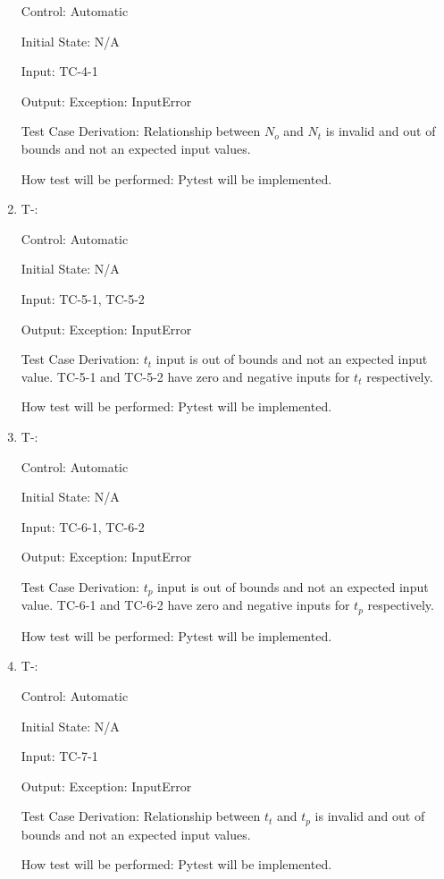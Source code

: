 \documentclass[12pt, titlepage]{article}
\newcounter{tinnum} %
\begin{document}
\begin{enumerate}
Control: Automatic
					
Initial State: N/A
					
Input: TC-4-1
					
Output: Exception: InputError

Test Case Derivation: Relationship between $N_o$ and $N_{t}$ is invalid and out 
of bounds and not an expected input values.

How test will be performed: Pytest will be implemented.


\item{T-}\thetinnum\label{T-5}:

Control: Automatic
					
Initial State: N/A
					
Input: TC-5-1, TC-5-2
					
Output: Exception: InputError

Test Case Derivation: $t_{t}$ input is out of bounds and not an expected input 
value. TC-5-1 and TC-5-2 have zero and negative inputs for $t_{t}$ respectively. 

How test will be performed: Pytest will be implemented.


\item{T-}\thetinnum\label{T-6}:

Control: Automatic
					
Initial State: N/A
					
Input: TC-6-1, TC-6-2
					
Output: Exception: InputError

Test Case Derivation: $t_{p}$ input is out of bounds and not an expected input 
value. TC-6-1 and TC-6-2 have zero and negative inputs for $t_{p}$ respectively. 

How test will be performed: Pytest will be implemented.


\item{T-}\thetinnum\label{T-7}:

Control: Automatic
					
Initial State: N/A
					
Input: TC-7-1
					
Output: Exception: InputError

Test Case Derivation: Relationship between $t_t$ and $t_{p}$ is invalid and out 
of bounds and not an expected input values.

How test will be performed: Pytest will be implemented.
 

\end{enumerate}
\end{document}
